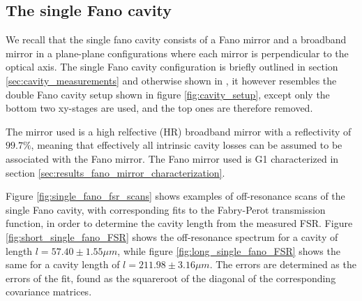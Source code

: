 \subsection{The single Fano cavity}\label{sec:the_single_fano_cavity_results}

We recall that the single fano cavity consists of a Fano mirror and a broadband mirror in a plane-plane configurations where each mirror is perpendicular to the optical axis. The single Fano cavity configuration is briefly outlined in section \ref{sec:cavity_measurements} and otherwise shown in \cite{Mitra}, it however resembles the double Fano cavity setup shown in figure \ref{fig:cavity_setup}, except only the bottom two xy-stages are used, and the top ones are therefore removed.   

The mirror used is a high relfective (HR) broadband mirror with a reflectivity of $99.7\%$, meaning that effectively all intrinsic cavity losses can be assumed to be associated with the Fano mirror. The Fano mirror used is G1 characterized in section \ref{sec:results_fano_mirror_characterization}. 

Figure \ref{fig:single_fano_fsr_scans} shows examples of off-resonance scans of the single Fano cavity, with corresponding fits to the Fabry-Perot transmission function, in order to determine the cavity length from the measured FSR. Figure \ref{fig:short_single_fano_FSR} shows the off-resonance spectrum for a cavity of length $l = 57.40 \pm 1.55 \mu m$, while figure \ref{fig:long_single_fano_FSR} shows the same for a cavity length of $l = 211.98 \pm 3.16 \mu m$. The errors are determined as the errors of the fit, found as the squareroot of the diagonal of the corresponding covariance matrices.

